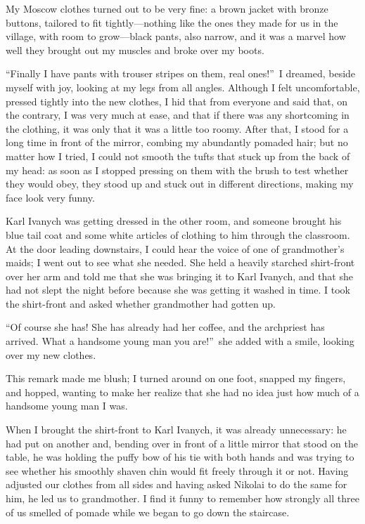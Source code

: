 My Moscow clothes turned out to be very fine: a brown jacket with bronze buttons, tailored to fit tightly---nothing like the ones they made for us in the village, with room to grow---black pants, also narrow, and it was a marvel how well they brought out my muscles and broke over my boots.

``Finally I have pants with trouser stripes on them, real ones!''~I dreamed, beside myself with joy, looking at my legs from all angles. Although I felt uncomfortable, pressed tightly into the new clothes, I hid that from everyone and said that, on the contrary, I was very much at ease, and that if there was any shortcoming in the clothing, it was only that it was a little too roomy. After that, I stood for a long time in front of the mirror, combing my abundantly pomaded hair; but no matter how I tried, I could not smooth the tufts that stuck up from the back of my head: as soon as I stopped pressing on them with the brush to test whether they would obey, they stood up and stuck out in different directions, making my face look very funny.

Karl Ivanych was getting dressed in the other room, and someone brought his blue tail coat and some white articles of clothing to him through the classroom. At the door leading downstairs, I could hear the voice of one of grandmother's maids; I went out to see what she needed. She held a heavily starched shirt-front over her arm and told me that she was bringing it to Karl Ivanych, and that she had not slept the night before because she was getting it washed in time. I took the shirt-front and asked whether grandmother had gotten up.

``Of course she has! She has already had her coffee, and the archpriest has arrived. What a handsome young man you are!''~she added with a smile, looking over my new clothes. %

This remark made me blush; I turned around on one foot, snapped my fingers, and hopped, wanting to make her realize that she had no idea just how much of a handsome young man I was.

When I brought the shirt-front to Karl Ivanych, it was already unnecessary: he had put on another and, bending over in front of a little mirror that stood on the table, he was holding the puffy bow of his tie with both hands and was trying to see whether his smoothly shaven chin would fit freely through it or not. Having adjusted our clothes from all sides and having asked Nikolai to do the same for him, he led us to grandmother. I find it funny to remember how strongly all three of us smelled of pomade while we began to go down the staircase.

